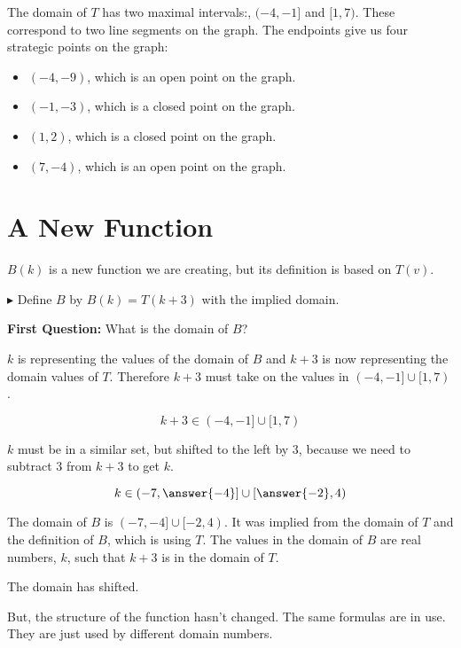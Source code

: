 \documentclass{ximera}
\begin{document}
The domain of $T$ has two maximal intervals:, $(-4,-1]$ and $[1,7)$.  These correspond to two line segments on the graph. The endpoints give us four strategic points on the graph: 

\begin{itemize}

\item $(-4, -9)$, which is an open point on the graph.
\item $(-1, -3)$, which is a closed point on the graph.
\item $(1, 2)$, which is a closed point on the graph.
\item $(7, -4)$, which is an open point on the graph.

\end{itemize}




\section{A New Function}

$B(k)$ is a new function we are creating, but its definition is based on $T(v)$.


$\blacktriangleright$ Define $B$ by $B(k) = T(k+3)$ with the implied domain.


\textbf{First Question:} What is the domain of $B$?

$k$ is representing the values of the domain of $B$ and $k+3$ is now representing the domain values of $T$.  Therefore $k+3$ must take on the values in $(-4,-1] \cup [1,7)$.

\[     k+3 \in      (-4,-1] \cup [1,7)     \]


$k$ must be in a similar set, but shifted to the left by $3$, because we need to subtract $3$ from $k+3$ to get $k$.


\[     k \in      \left( -7,\answer{-4} \right] \cup \left[ \answer{-2},4 \right)     \]


The domain of $B$ is $(-7,-4] \cup [-2,4)$.   It was implied from the domain of $T$ and the definition of $B$, which is using $T$.  The values in the domain of $B$ are real numbers, $k$, such that $k+3$ is in the domain of $T$.

The domain has shifted. 


But, the structure of the function hasn't changed.  The same formulas are in use.  They are just used by different domain numbers.
\end{document}
